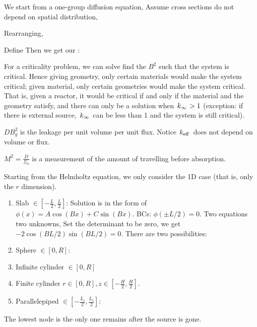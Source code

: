 \documentclass{school-22.211-notes}
\begin{document}
We start from a one-group diffusion equation,
Assume cross sections do not depend on spatial distribution, 

Rearranging, 

Define  
Then we get our :


For a criticality problem, we can solve find the $B^2$ such that the system is critical. Hence giving geometry, only certain materials would make the system critical; given material, only certain geometries would make the system critical. That is, given a reactor, it would be critical if and only if the material and the geometry satisfy,
and there can only be a solution when $\left. k_{\infty} \right. > 1$ (exception: if there is external source, $\left. k_{\infty} \right.$ can be less than 1 and the system is still critical). 


$DB^2_g$ is the leakage per unit volume per unit flux. Notice $\left. k_{\mathrm{eff}} \right.$ does not depend on volume or flux. 


 $M^2 = \frac{D}{\Sigma_a}$ is a measurement of the amount of travelling before absorption. 


Starting from the Helmholtz equation, we only consider the 1D case (that is, only the $r$ dimension).
\begin{enumerate}
\item Slab $\in  \left[- \frac{L}{2}, \frac{L}{2} \right]$:
  Solution is in the form of $\phi(x) = A \cos (Bx) + C \sin(Bx)$. BCs: $\phi(\pm L/2) = 0$. Two equations two unknowns, 
  Set the determinant to be zero, we get $-2 \cos (BL/2) \sin (BL/2) = 0$. There are two possibilities: 
  
\item Sphere $\in [0, R]$:
\item Infinite cylinder $\in [0, R]$
\item Finite cylinder $r \in [0, R], z \in \left[ -\frac{H}{2}, \frac{H}{2} \right]$. 
\item Parallelepiped $\in \left[ -\frac{L_i}{2}, \frac{L_i}{2} \right]$: 
\end{enumerate}
The lowest node is the only one remains after the source is gone. 
\end{document}
